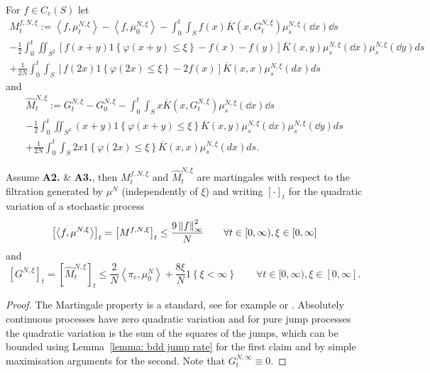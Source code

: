 \begin{definition}
For $f\in C_c(S)$ let
\begin{multline*}
M_t^{f,N,\xi} := \left<f, \mu_t^{N,\xi}\right> - \left<f, \mu_0^{N,\xi}\right> 
- \int_0^t \int_{S}f(x) \overline{K}\left(x,G^{N,\xi}_t\right)\mu^{N,\xi}_s(\dd x)\dd s\\
- \frac12 \int_0^t \iint_{S^2}\left[f(x+y)1\left\{\varphi(x+y) \leq \xi \right\} - f(x) - f(y)\right]
      \overline{K}(x,y)\mu^{N,\xi}_s(\dd x)\mu^{N,\xi}_s(\dd y) ds \\
      + \frac{1}{2N}\int_0^t \int_S \left[f(2x)1\left\{\varphi(2x) \leq \xi \right\} - 2f(x)\right]\overline{K}(x,x)\mu^{N,\xi}_s(d x) d s
\end{multline*}
and
\begin{multline*}
\widehat{M}_t^{N,\xi} := G_t^{N,\xi} - G_0^{N,\xi} 
- \int_0^t \int_{S}x \overline{K}\left(x,G^{N,\xi}_t\right)\mu^{N,\xi}_s(\dd x)\dd s\\
- \frac12 \int_0^t \iint_{S^2}(x+y)1\left\{\varphi(x+y) \leq \xi \right\}
      \overline{K}(x,y)\mu^{N,\xi}_s(\dd x)\mu^{N,\xi}_s(\dd y) ds \\
      + \frac{1}{2N}\int_0^t \int_S 2x 1\left\{\varphi(2x) \leq \xi \right\}\overline{K}(x,x)\mu^{N,\xi}_s(d x) d s.
\end{multline*}
\end{definition}

\begin{lemma}\label{lemma: qvar}
Assume \textbf{A2.} \& \textbf{A3.}, then $M_t^{f,N,\xi}$ and $\widehat{M}_t^{N,\xi}$ are martingales with respect to the filtration generated by $\mu^N$ (independently of $\xi$) and writing $[\cdot]_t$ for the quadratic variation of a stochastic process
\begin{equation*}
    \left[\left<f, \mu^{N,\xi}\right>\right]_t
    = \left[M^{f,N,\xi}\right]_t
    \leq \frac{9 \left\lVert{f}\right\rVert_\infty^2}{N} \qquad \forall t \in [0,\infty), \xi \in [0,\infty]
\end{equation*}
and
\begin{equation*}
    \left[G^{N,\xi}\right]_t
    = \left[\widehat{M}_t^{N,\xi}\right]_t
    \leq \frac{2}{N}\left<\pi_e, \mu^N_0\right> + \frac{8\xi}{N}1\left\{\xi < \infty \right\} \qquad \forall t \in [0,\infty), \xi \in [0,\infty].
\end{equation*}
\end{lemma}
\begin{proof}
The Martingale property is a standard, see for example \cite[Ch. 4, Prop 1.7]{EK86} or \cite[Lem. 19.21]{K02}.
Absolutely continuous processes have zero quadratic variation and for pure jump processes the quadratic variation is the sum of the squares of the jumps, which can be bounded using Lemma~\ref{lemma: bdd jump rate} for the first claim and by simple maximisation arguments for the second.
Note that $G^{N,\infty}_t \equiv 0$.
\end{proof}


